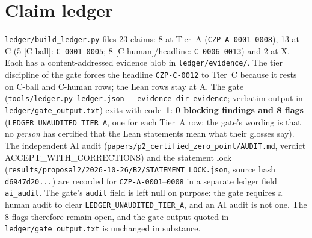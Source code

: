 \documentclass[10pt]{article}
\newcommand{\tier}[1]{\textsf{[#1]}}
\newcommand{\tCh}{\tier{C-human}}
\newcommand{\tCb}{\textcolor{blue!60!black}{\textsf{[C-ball]}}}
\begin{document}
\section{Claim ledger}\label{sec:ledger}
\texttt{ledger/build\_ledger.py} files 23 claims: 8 at Tier~A (\texttt{CZP-A-0001}--\texttt{0008}), 13 at C (5 \tCb{}: \texttt{C-0001}--\texttt{0005}; 8 \tCh{}/headline: \texttt{C-0006}--\texttt{0013}) and 2 at X. Each has a content-addressed evidence blob in \texttt{ledger/evidence/}. The tier discipline of the gate forces the headline \texttt{CZP-C-0012} to Tier~C because it rests on C-ball and C-human rows; the Lean rows stay at A.
The gate (\texttt{tools/ledger.py ledger.json -{}-evidence-dir evidence}; verbatim output in \texttt{ledger/gate\_output.txt}) exits with code~\textbf{1}: \textbf{0 blocking findings and 8 flags} (\texttt{LEDGER\_UNAUDITED\_TIER\_A}, one for each Tier~A row; the gate's wording is that no \emph{person} has certified that the Lean statements mean what their glosses say). The independent AI audit (\texttt{papers/p2\_certified\_zero\_point/AUDIT.md}, verdict ACCEPT\_WITH\_CORRECTIONS) and the statement lock (\texttt{results/proposal2/2026-10-26/B2/STATEMENT\_LOCK.json}, source hash \texttt{d6947d20...}) are recorded for \texttt{CZP-A-0001}--\texttt{0008} in a separate ledger field \texttt{ai\_audit}. The gate's \texttt{audit} field is left null on purpose: the gate requires a human audit to clear \texttt{LEDGER\_UNAUDITED\_TIER\_A}, and an AI audit is not one. The 8 flags therefore remain open, and the gate output quoted in \texttt{ledger/gate\_output.txt} is unchanged in substance.

\end{document}
